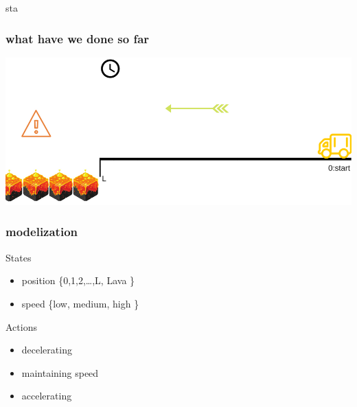 sta\documentclass[dvipsnames,svgnames]{beamer}
\begin{document}
\begin{frame}
\frametitle{what have we done so far}
\begin{center}
\includegraphics[scale=0.4]{illustration2.png}
\end{center}
\end{frame}

\begin{frame}
\frametitle{modelization}
\begin{block}{States}
\begin{itemize}
\item \pause position \{0,1,2,\ldots ,L, Lava  \}
\item \pause speed    \{low, medium, high   \}
\end{itemize}
\end{block}
\pause
\begin{block}{Actions}
\begin{itemize}
\item \pause decelerating 
\item \pause maintaining speed
\item \pause accelerating 
\end{itemize}
\end{block}
\end{frame}
\end{document}
